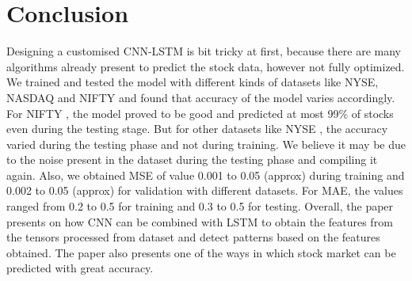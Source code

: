 \documentclass[conference]{IEEEtran}
\begin{document}
\section {Conclusion}
Designing a customised CNN-LSTM is bit tricky at first, because there are many algorithms already present to predict the stock data, however not fully optimized. We trained and tested the model with different kinds of datasets like NYSE, NASDAQ and NIFTY and found that accuracy of the model varies accordingly. For NIFTY \cite {b11}, the model proved to be good and predicted at most 99\% of stocks even during the testing stage. But for other datasets like NYSE \cite{b12}, the accuracy varied during the testing phase and not during training. We believe it may be due to the noise present in the dataset during the testing phase and compiling it again. Also, we obtained MSE of value 0.001 to 0.05 (approx) during training and 0.002 to 0.05 (approx) for validation with different datasets. For MAE, the values ranged from 0.2 to 0.5 for training and 0.3 to 0.5 for testing. Overall, the paper presents on how CNN can be combined with LSTM to obtain the features from the tensors processed from dataset and detect patterns based on the features obtained. The paper also presents one of the ways in which stock market can be predicted with great accuracy.
\end{document}
